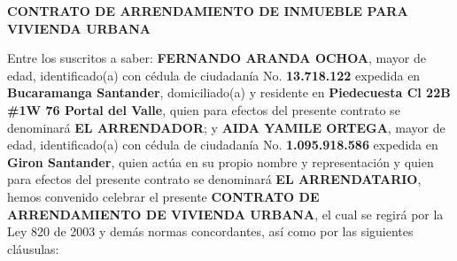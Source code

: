 \documentclass[12pt,letterpaper]{article}
\begin{document}
\begin{center}
    {\Large \textbf{CONTRATO DE ARRENDAMIENTO DE INMUEBLE PARA VIVIENDA URBANA}}
\end{center}

\vspace{0.5cm}

Entre los suscritos a saber: \textbf{FERNANDO ARANDA OCHOA}, mayor de edad, identificado(a) con cédula de ciudadanía No. \textbf{13.718.122} expedida en \textbf{Bucaramanga Santander}, domiciliado(a) y residente en \textbf{Piedecuesta Cl 22B \#1W 76 Portal del Valle}, quien para efectos del presente contrato se denominará \textbf{EL ARRENDADOR}; y \textbf{AIDA YAMILE ORTEGA}, mayor de edad, identificado(a) con cédula de ciudadanía No. \textbf{1.095.918.586} expedida en \textbf{Giron Santander}, quien actúa en su propio nombre y representación y quien para efectos del presente contrato se denominará \textbf{EL ARRENDATARIO}, hemos convenido celebrar el presente \textbf{CONTRATO DE ARRENDAMIENTO DE VIVIENDA URBANA}, el cual se regirá por la Ley 820 de 2003 y demás normas concordantes, así como por las siguientes cláusulas:
\end{document}
